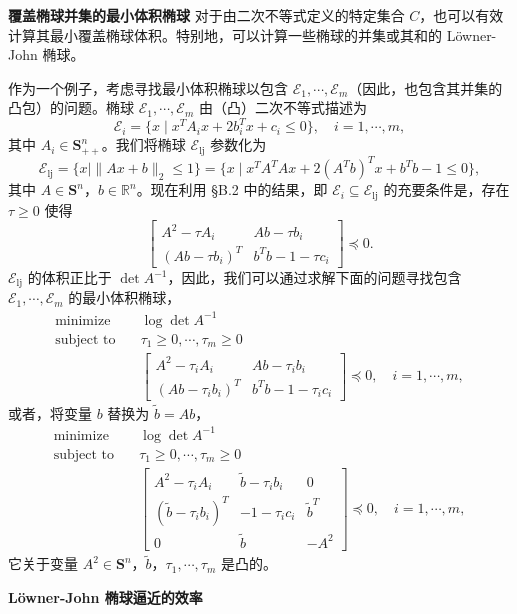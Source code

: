 \documentclass[UTF8,12pt,a4paper,fontset=fandol]{ctexart}
\begin{document}
\noindent\textbf{覆盖椭球并集的最小体积椭球}\quad
对于由二次不等式定义的特定集合 $C$，也可以有效计算其最小覆盖椭球体积。特别地，可以计算一些椭球的并集或其和的 Löwner-John 椭球。

作为一个例子，考虑寻找最小体积椭球以包含 $\mathcal{E}_1,\cdots,\mathcal{E}_m$（因此，也包含其并集的凸包）的问题。椭球 $\mathcal{E}_1,\cdots,\mathcal{E}_m$ 由（凸）二次不等式描述为
\[
\mathcal{E}_i=\{x\mid x^TA_ix+2b_i^Tx+c_i\leq 0\},\quad i=1,\cdots,m,
\]
其中 $A_i\in\mathbf{S}_{++}^n$。我们将椭球 $\mathcal{E}_{\mathrm{lj}}$ 参数化为
\[
\mathcal{E}_{\mathrm{lj}}=\{x\mid \|Ax+b\|_2\leq 1\}
=\{x\mid x^TA^TAx+2(A^Tb)^Tx+b^Tb-1\leq 0\},
\]
其中 $A\in\mathbf{S}^n$，$b\in\mathbb{R}^n$。现在利用 \S B.2 中的结果，即 $\mathcal{E}_i\subseteq\mathcal{E}_{\mathrm{lj}}$ 的充要条件是，存在 $\tau\geq 0$ 使得
\[
\begin{bmatrix}
A^2-\tau A_i & Ab-\tau b_i\\
(Ab-\tau b_i)^T & b^Tb-1-\tau c_i
\end{bmatrix}\preceq 0.
\]
$\mathcal{E}_{\mathrm{lj}}$ 的体积正比于 $\det A^{-1}$，因此，我们可以通过求解下面的问题寻找包含 $\mathcal{E}_1,\cdots,\mathcal{E}_m$ 的最小体积椭球，
\[
\begin{aligned}
\text{minimize}\quad & \log\det A^{-1}\\
\text{subject to}\quad & \tau_1\geq 0,\cdots,\tau_m\geq 0\\
& \begin{bmatrix}
A^2-\tau_i A_i & Ab-\tau_i b_i\\
(Ab-\tau_i b_i)^T & b^Tb-1-\tau_i c_i
\end{bmatrix}\preceq 0,\quad i=1,\cdots,m,
\end{aligned}
\]
或者，将变量 $b$ 替换为 $\tilde{b}=Ab$，
\[
\begin{aligned}
\text{minimize}\quad & \log\det A^{-1}\\
\text{subject to}\quad & \tau_1\geq 0,\cdots,\tau_m\geq 0\\
& \begin{bmatrix}
A^2-\tau_i A_i & \tilde{b}-\tau_i b_i & 0\\
(\tilde{b}-\tau_i b_i)^T & -1-\tau_i c_i & \tilde{b}^T\\
0 & \tilde{b} & -A^2
\end{bmatrix}\preceq 0,\quad i=1,\cdots,m,
\end{aligned}
\]
它关于变量 $A^2\in\mathbf{S}^n$，$\tilde{b}$，$\tau_1,\cdots,\tau_m$ 是凸的。

\noindent\textbf{Löwner-John 椭球逼近的效率}
\end{document}
